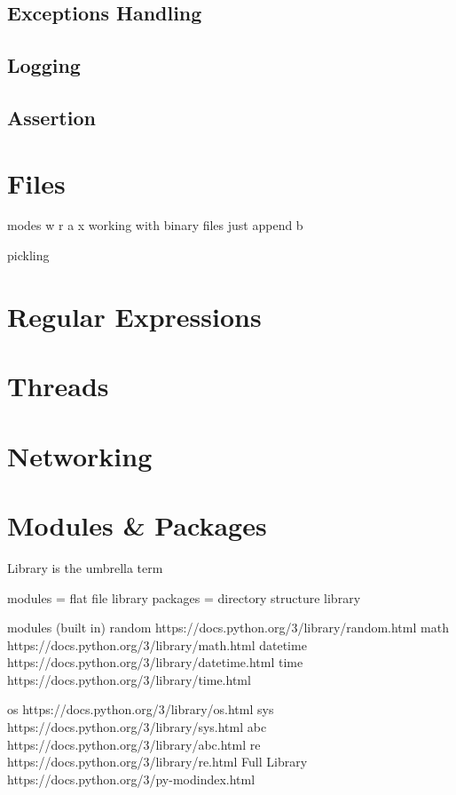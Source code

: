 \documentclass[10pt]{article}
\begin{document}
  \subsection{Exceptions Handling}

  \subsection{Logging}

  \subsection{Assertion}


\section{Files}

  modes
    w
    r
    a
    x
    working with binary files just append b

  pickling

\section{Regular Expressions}

\section{Threads}

\section{Networking}

\section{Modules \& Packages}

  Library is the umbrella term

  modules = flat file library
  packages = directory structure library

  modules (built in)
    random https://docs.python.org/3/library/random.html
    math https://docs.python.org/3/library/math.html
    datetime https://docs.python.org/3/library/datetime.html
    time https://docs.python.org/3/library/time.html

    os https://docs.python.org/3/library/os.html
    sys https://docs.python.org/3/library/sys.html
    abc https://docs.python.org/3/library/abc.html
    re https://docs.python.org/3/library/re.html
    Full Library https://docs.python.org/3/py-modindex.html
\end{document}
